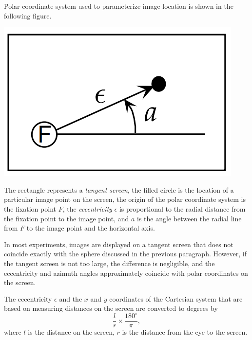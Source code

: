 \begin{defn}
  \label{defn:PolarCoord}
  Polar coordinate system used to parameterize image location is shown in the following figure.
  \begin{center}
    \includegraphics[scale=0.15]{./png/polarCoord}
  \end{center}
  The rectangle represents a \emph{tangent screen}, the filled circle is the location of a particular image point on the screen, the origin of the polar coordinate system is the fixation point $F$, the \emph{eccentricity} $\epsilon$ is proportional to the radial distance from the fixation point to the image point, and $a$ is the angle between the radial line from $F$ to the image point and the horizontal axis.
\end{defn}

\begin{rem}
  In most experiments, images are displayed on a tangent screen that does not coincide exactly with the sphere discussed in the previous paragraph. However, if the tangent screen is not too large, the difference is negligible, and the eccentricity and azimuth angles approximately coincide with polar coordinates on the screen.
\end{rem}

\begin{asm}
  \label{asm:unit}
  The eccentricity $\epsilon$ and the $x$ and $y$ coordinates of the Cartesian system that are based on measuring distances on the screen are converted to degrees by
  \begin{equation}
    \label{equ:conversion}
    \frac{l}{r}\times\frac{180^{\circ}}{\pi},
  \end{equation}
  where $l$ is the distance on the screen, $r$ is the distance from the eye to the screen.
\end{asm}

